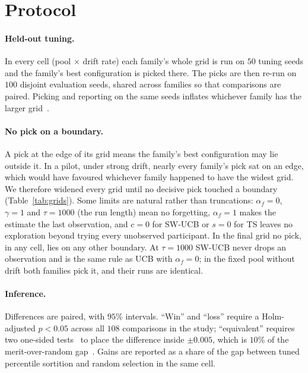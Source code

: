 \documentclass[sigconf,anonymous,review,nonacm]{acmart}
\begin{document}
\section{Protocol}
\label{sec:protocol}

\paragraph{Held-out tuning.} In every cell (pool $\times$ drift rate) each family's whole
grid is run on $50$ tuning seeds and the family's best configuration is picked there. The
picks are then re-run on $100$ disjoint evaluation seeds, shared across families so that
comparisons are paired. Picking and reporting on the same seeds inflates whichever family
has the larger grid~\cite{smith2006optimizer,cawley2010overfitting}.

\paragraph{No pick on a boundary.} A pick at the edge of its grid means the family's best
configuration may lie outside it. In a pilot, under strong drift, nearly every family's pick
sat on an edge, which would have favoured whichever family happened to have the widest
grid. We therefore widened every grid until no decisive pick touched a boundary
(Table~\ref{tab:grids}). Some limits are natural rather than truncations: $\alpha_f=0$,
$\gamma=1$ and $\tau=1000$ (the run length) mean no forgetting, $\alpha_f=1$ makes the
estimate the last observation, and $c=0$ for SW-UCB or $s=0$ for TS leaves no exploration
beyond trying every unobserved participant. In the final grid no pick, in any cell, lies on
any other boundary. At $\tau=1000$ SW-UCB never drops an observation and is the same rule as
UCB with $\alpha_f=0$; in the fixed pool without drift both families pick it, and their runs
are identical.

\paragraph{Inference.} Differences are paired, with $95\%$ intervals. ``Win'' and ``loss''
require a Holm-adjusted $p<0.05$ across all $108$ comparisons in the study;
``equivalent'' requires two one-sided tests~\cite{schuirmann1987tost,lakens2017equivalence}
to place the difference inside $\pm0.005$, which is $10\%$ of the merit-over-random
gap~\cite{companionA}. Gains are reported as a share of the gap between tuned percentile
sortition and random selection in the same cell.
\end{document}
